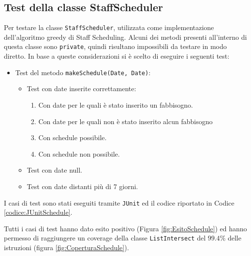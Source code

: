 \subsection{Test della classe StaffScheduler}
Per testare la classe \verb|StaffScheduler|, utilizzata come implementazione dell'algoritmo greedy di Staff Scheduling.
Alcuni dei metodi presenti all'interno di questa classe sono \verb|private|, quindi risultano impossibili da testare in modo diretto. In base a queste considerazioni si è scelto di eseguire i seguenti test:
\begin{itemize}
	\item Test del metodo \verb|makeSchedule(Date, Date)|:
		\begin{itemize}
			\item Test con date inserite correttamente:
				\begin{enumerate}
					\item Con date per le quali è stato inserito un fabbisogno.
					\item Con date per le quali non è stato inserito alcun fabbisogno
					\item Con schedule possibile.
					\item Con schedule non possibile.
				\end{enumerate}
			\item Test con date null.
			\item Test con date distanti più di 7 giorni.
		\end{itemize}
\end{itemize}
\noindent
\noindent
I casi di test sono stati eseguiti tramite \verb|JUnit| ed il codice riportato in Codice \ref{codice:JUnitSchedule}.
\lstset{
    caption=Casi JUnit per il test della classe StaffScheduler,
    label=codice:JUnitSchedule
 }


\noindent
Tutti i casi di test hanno dato esito positivo (Figura \ref{fig:EsitoSchedule}) ed hanno permesso di raggiungere un coverage della classe \verb|ListIntersect| del $99.4\%$ delle istruzioni (figura \ref{fig:CoperturaSchedule}).

